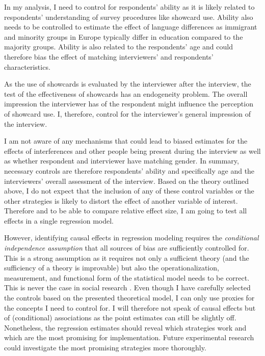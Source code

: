 \documentclass[a4paper,12pt]{article}
\begin{document}
In my analysis, I need to control for respondents' ability as it is likely related to respondents' understanding of survey procedures like showcard use. Ability also needs to be controlled to estimate the effect of language differences as immigrant and minority groups in Europe typically differ in education compared to the majority groups. Ability is also related to the respondents' age and could therefore bias the effect of matching interviewers' and respondents' characteristics.

As the use of showcards is evaluated by the interviewer after the interview, the test of the effectiveness of showcards has an endogeneity problem. The overall impression the interviewer has of the respondent might influence the perception of showcard use. I, therefore, control for the interviewer's general impression of the interview.

I am not aware of any mechanisms that could lead to biased estimates for the effects of interferences and other people being present during the interview as well as whether respondent and interviewer have matching gender. In summary, necessary controls are therefore respondents' ability and specifically age and the interviewers' overall assessment of the interview. Based on the theory outlined above, I do not expect that the inclusion of any of these control variables or the other strategies is likely to distort the effect of another variable of interest. Therefore and to be able to compare relative effect size, I am going to test all effects in a single regression model.

However, identifying causal effects in regression modeling requires the \textit{conditional independence assumption} \citep[52ff]{angristMostlyHarmlessEconometrics2009} that all sources of bias are sufficiently controlled for. This is a strong assumption as it requires not only a sufficient theory (and the sufficiency of a theory is improvable) but also the operationalization, measurement, and functional form of the statistical model needs to be correct. This is never the case in social research \citep{martinThinkingStatistics2018}. Even though I have carefully selected the controls based on the presented theoretical model, I can only use proxies for the concepts I need to control for. I will therefore not speak of causal effects but of (conditional) associations as the point estimates can still be slightly off. Nonetheless, the regression estimates should reveal which strategies work and which are the most promising for implementation. Future experimental research could investigate the most promising strategies more thoroughly.
\end{document}
